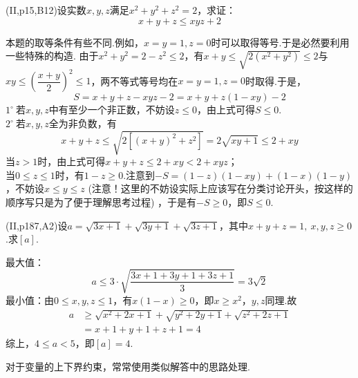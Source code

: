 \documentclass[cn,hazy,black,10pt,normal]{elegantnote}
\newenvironment{guess}{
  \color{guess}}{\newline \color{black}}
\newcommand{\ssb}[1]{\left( #1 \right)}
\newcommand{\buzhou}[1]{$#1^{\circ} \ $}
\newcommand{\hlt}[1]{\color{red} #1 \color{black}}
\begin{document}
\begin{problem}
	(II,p15,B12)设实数$x,y,z$满足$x^2+y^2+z^2=2$，求证：$$x+y+z \leq xyz+2$$
\end{problem}
\begin{solution}
	\begin{guess}
		本题的取等条件有些不同.例如，$x=y=1,z=0$时可以取得等号.于是必然要利用一些特殊的构造.
	\end{guess}
	由于$x^2+y^2=2-z^2 \leq 2$，有$x+y \leq \sqrt{2(x^2+y^2)} \leq 2$与$xy \leq \ssb{\dfrac{x+y}{2}}^2 \leq 1$，两不等式等号均在$x=y=1,z=0$时取得.于是，$$S = x+y+z-xyz-2 = x+y+z(1-xy)-2$$
	\buzhou{1}若$x,y,z$中有至少一个非正数，不妨设$z \leq 0$，由上式可得$S \leq 0$. \\
	\buzhou{2}若$x,y,z$全为非负数，有$$x+y+z \leq \sqrt{2[(x+y)^2 + z^2]} = 2\sqrt{xy+1} \leq 2+xy$$
	当$z>1$时，由上式可得$x+y+z \leq 2+xy < 2+xyz$； \\
	当$0 \leq z \leq 1$时，有$1-z \geq 0$.注意到$-S = (1-z)(1-xy) + (1-x)(1-y)$，不妨设$x \leq y \leq z$\hlt{(注意！这里的不妨设实际上应该写在分类讨论开头，按这样的顺序写只是为了便于理解思考过程)}，于是有$-S \geq 0$，即$S \leq 0$.
\end{solution}

\begin{problem}
	(II,p187,A2)设$a=\sqrt{3x+1}+\sqrt{3y+1}+\sqrt{3z+1}$，其中$x+y+z=1,~x,y,z\geq 0$.求$[a]$.
\end{problem}
\begin{solution}
	最大值：$$a \leq 3 \cdot \sqrt{\dfrac{3x+1+3y+1+3z+1}{3}} = 3 \sqrt{2}$$
	最小值：由$0 \leq x,y,z \leq 1$，有$x(1-x) \geq 0$，即$x \geq x^2$，$y,z$同理.故
	\begin{align*}
		a &\geq \sqrt{x^2+2x+1} + \sqrt{y^2+2y+1} + \sqrt{z^2+2z+1} \\
		&= x+1+y+1+z+1 = 4
	\end{align*}
	综上，$4 \leq a <5$，即$[a]=4$.
\end{solution}
\begin{remark}
	对于变量的上下界约束，常常使用类似解答中的思路处理.
\end{remark}
\end{document}
